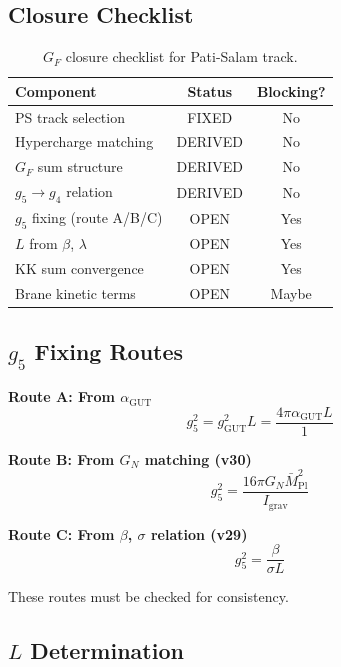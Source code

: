 \documentclass[11pt,a4paper]{article}
\begin{document}
\subsection{Closure Checklist}
\label{subsec:closure-checklist}

\begin{table}[ht]
\centering
\caption{$G_F$ closure checklist for Pati-Salam track.}
\label{tab:gf-checklist}
\begin{tabular}{lcc}
\toprule
Component & Status & Blocking? \\
\midrule
PS track selection & FIXED & No \\
Hypercharge matching & DERIVED & No \\
$G_F$ sum structure & DERIVED & No \\
$g_5 \to g_4$ relation & DERIVED & No \\
$g_5$ fixing (route A/B/C) & OPEN & Yes \\
$L$ from $\beta$, $\lambda$ & OPEN & Yes \\
KK sum convergence & OPEN & Yes \\
Brane kinetic terms & OPEN & Maybe \\
\bottomrule
\end{tabular}
\end{table}

\subsection{$g_5$ Fixing Routes}
\label{subsec:g5-routes}

\textbf{Route A: From $\alpha_{\text{GUT}}$}
\begin{equation}
\label{eq:route-a}
g_5^2 = g_{\text{GUT}}^2 L = \frac{4\pi \alpha_{\text{GUT}} L}{1}
\end{equation}

\textbf{Route B: From $G_N$ matching (v30)}
\begin{equation}
\label{eq:route-b}
g_5^2 = \frac{16\pi G_N \bar{M}_{\text{Pl}}^2}{I_{\text{grav}}}
\end{equation}

\textbf{Route C: From $\beta$, $\sigma$ relation (v29)}
\begin{equation}
\label{eq:route-c}
g_5^2 = \frac{\beta}{\sigma L}
\end{equation}

These routes must be checked for consistency.

\subsection{$L$ Determination}
\label{subsec:L-determination}
\end{document}
